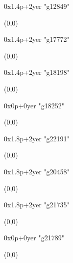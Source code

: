    0x1.4p+2yer "g12849"
  \begin{textblock}{1}(0,0)
  \end{textblock}

   0x1.4p+2yer "g17772"
  \begin{textblock}{1}(0,0)
  \end{textblock}

   0x1.4p+2yer "g18198"
  \begin{textblock}{1}(0,0)
  \end{textblock}

   0x0p+0yer "g18252"
  \begin{textblock}{1}(0,0)
  \end{textblock}

   0x1.8p+2yer "g22191"
  \begin{textblock}{1}(0,0)
  \end{textblock}

   0x1.8p+2yer "g20458"
  \begin{textblock}{1}(0,0)
  \end{textblock}

   0x1.8p+2yer "g21735"
  \begin{textblock}{1}(0,0)
  \end{textblock}

   0x0p+0yer "g21789"
  \begin{textblock}{1}(0,0)
  \end{textblock}
